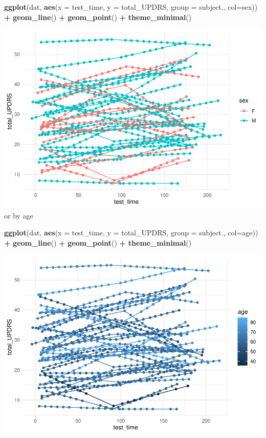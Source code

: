\documentclass[
]{article}
\newenvironment{Shaded}{\begin{snugshade}}{\end{snugshade}}
\newcommand{\AttributeTok}[1]{\textcolor[rgb]{0.13,0.29,0.53}{#1}}
\newcommand{\FunctionTok}[1]{\textcolor[rgb]{0.13,0.29,0.53}{\textbf{#1}}}
\newcommand{\NormalTok}[1]{#1}
\newcommand{\SpecialCharTok}[1]{\textcolor[rgb]{0.81,0.36,0.00}{\textbf{#1}}}
\begin{document}
\begin{Shaded}
\begin{Highlighting}[]
\FunctionTok{ggplot}\NormalTok{(dat, }\FunctionTok{aes}\NormalTok{(}\AttributeTok{x =}\NormalTok{ test\_time, }\AttributeTok{y =}\NormalTok{ total\_UPDRS, }\AttributeTok{group =}\NormalTok{ subject., }\AttributeTok{col=}\NormalTok{sex)) }\SpecialCharTok{+} 
  \FunctionTok{geom\_line}\NormalTok{() }\SpecialCharTok{+}
  \FunctionTok{geom\_point}\NormalTok{() }\SpecialCharTok{+}
  \FunctionTok{theme\_minimal}\NormalTok{()}
\end{Highlighting}
\end{Shaded}

\includegraphics{Data_Exploration_files/figure-latex/unnamed-chunk-12-1.pdf}
or by age

\begin{Shaded}
\begin{Highlighting}[]
\FunctionTok{ggplot}\NormalTok{(dat, }\FunctionTok{aes}\NormalTok{(}\AttributeTok{x =}\NormalTok{ test\_time, }\AttributeTok{y =}\NormalTok{ total\_UPDRS, }\AttributeTok{group =}\NormalTok{ subject., }\AttributeTok{col=}\NormalTok{age)) }\SpecialCharTok{+} 
  \FunctionTok{geom\_line}\NormalTok{() }\SpecialCharTok{+}
  \FunctionTok{geom\_point}\NormalTok{() }\SpecialCharTok{+}
  \FunctionTok{theme\_minimal}\NormalTok{()}
\end{Highlighting}
\end{Shaded}

\includegraphics{Data_Exploration_files/figure-latex/unnamed-chunk-13-1.pdf}
\end{document}
